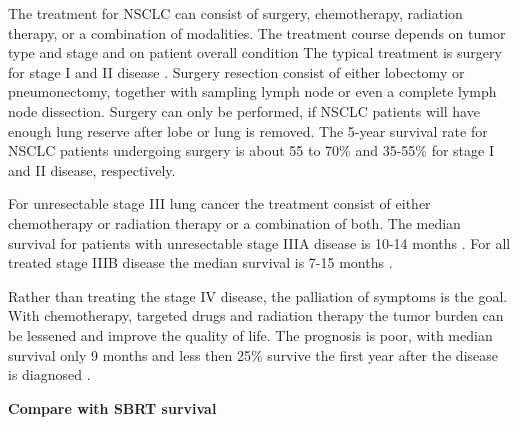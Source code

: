 \documentclass[type=dr, dr=rernat, accentcolor=tud7b,colorbacktitle, bigchapter, openright, twoside, 12pt ]{tudthesis}
\begin{document}
The treatment for NSCLC can consist of surgery, chemotherapy, radiation therapy, or a combination of modalities. The treatment course depends on tumor type and stage and on patient overall condition
The typical treatment is surgery for stage I and II disease \cite{Tsao2008}. Surgery resection consist of either lobectomy or pneumonectomy, together with sampling lymph node or even a complete lymph node
dissection. Surgery can only be performed, if NSCLC patients will have enough lung reserve after lobe or lung is removed. The 5-year survival rate for NSCLC patients undergoing surgery is about 55 to 70\% 
and 35-55\% for stage I and II disease, respectively.

For unresectable stage III lung cancer the treatment consist of either chemotherapy or radiation therapy or a combination of both. The median survival for patients with unresectable stage IIIA disease is 10-14 months \cite{Tsao2008}.
For all treated stage IIIB disease the median survival is 7-15 months \cite{Srisam2005}.

Rather than treating the stage IV disease, the palliation of symptoms is the goal. With chemotherapy, targeted drugs and radiation therapy the tumor burden can be lessened and improve the quality of life. The prognosis is poor, with
median survival only 9 months and less then 25\% survive the first year after the disease is diagnosed \cite{Tsao2008}.

\textbf{Compare with SBRT survival}



{}
% 
\end{document}
